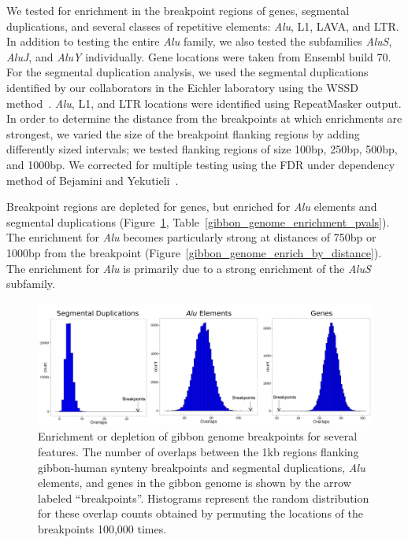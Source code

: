 We tested for enrichment in the breakpoint regions of genes, segmental duplications, and several classes of repetitive elements: \emph{Alu}, L1, LAVA, and LTR. In addition to testing the entire \emph{Alu} family, we also tested the subfamilies \emph{AluS}, \emph{AluJ}, and \emph{AluY} individually. Gene locations were taken from Ensembl build 70. For the segmental duplication analysis, we used the segmental duplications identified by our collaborators in the Eichler laboratory using the WSSD method~\cite{Bailey:2002jp}. \emph{Alu}, L1, and LTR locations were identified using RepeatMasker output. In order to determine the distance from the breakpoints at which enrichments are strongest, we varied the size of the breakpoint flanking regions by adding differently sized intervals; we tested flanking regions of size 100bp, 250bp, 500bp, and 1000bp. We corrected for multiple testing using the FDR under dependency method of Bejamini and Yekutieli~\cite{Benjamini:2001fs}. 

Breakpoint regions are depleted for genes, but enriched for \emph{Alu} elements and segmental duplications (Figure~\ref{gibbon_genome_histograms}, Table~\ref{gibbon_genome_enrichment_pvals}). The enrichment for \emph{Alu} becomes particularly strong at distances of 750bp or 1000bp from the breakpoint (Figure~\ref{gibbon_genome_enrich_by_distance}). The enrichment for \emph{Alu} is primarily due to a strong enrichment of the \emph{AluS} subfamily.

\begin{figure}
\centering
\includegraphics[width=.9\textwidth]{figures/gibbon_genome_histograms.pdf}
\caption[Enrichment or depletion of gibbon genome breakpoints for several features.]{Enrichment or depletion of gibbon genome breakpoints for several features. The number of overlaps between the 1kb regions flanking gibbon-human synteny breakpoints and segmental duplications, \emph{Alu} elements, and genes in the gibbon genome is shown by the arrow labeled ``breakpoints''. Histograms represent the random distribution for these overlap counts obtained by permuting the locations of the breakpoints 100,000 times.}
\label{gibbon_genome_histograms}
\end{figure}

